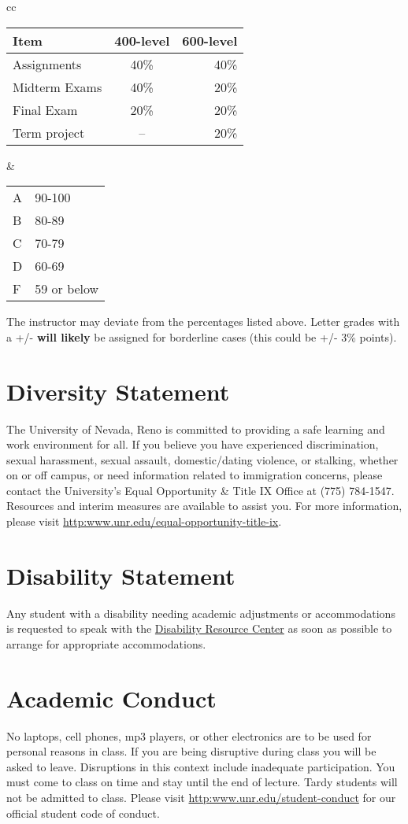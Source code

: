\documentclass[11pt,onecolumn]{article}
\begin{document}
\begin{center}
\begin{tabular}{cc}
\begin{tabular}{l|c|r}	%
Item&400-level& 600-level\\\hline\hline
  Assignments&40\% & 40\%\\
  Midterm Exams&40\%& 20\%\\
  Final Exam&20\%& 20\%\\
  Term project &-- &20\%\\
\end{tabular}
&
\begin{tabular}{ll}
A&90-100\\
B&80-89\\
C&70-79\\
D&60-69\\
F&59 or below
\end{tabular}
\end{tabular}
\end{center}

The instructor may deviate from the percentages listed above. Letter grades with a +/- \textbf{will likely} be assigned for borderline cases (this could be +/- 3\% points). 

\section*{Diversity Statement}
The University of Nevada, Reno is committed to providing a safe learning and work environment for all. If you believe you have experienced discrimination, sexual harassment, sexual assault, domestic/dating violence, or stalking, whether on or off campus, or need information related to immigration concerns, please contact the University’s Equal Opportunity \& Title IX Office at (775) 784-1547. Resources and interim measures are available to assist you. For more information, please visit \url{http:www.unr.edu/equal-opportunity-title-ix}.

\section*{Disability Statement}
Any student with a disability needing academic adjustments or accommodations is requested to speak with the \href{http:www.unr.edu/drc}{Disability Resource Center} as soon as possible to arrange for appropriate accommodations.

\section*{Academic Conduct}
No laptops, cell phones, mp3 players, or other electronics are to be used for personal reasons in class. If you are being disruptive during class you will be asked to leave. Disruptions in this context include inadequate participation. You must come to class on time and stay until the end of lecture. Tardy students will not be admitted to class. Please visit \url{http:www.unr.edu/student-conduct} for our official student code of conduct.
\end{document}
